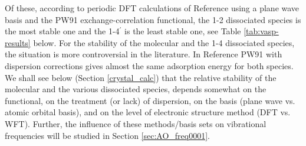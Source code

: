 \documentclass[11pt,DIV=13,BCOR=5mm,a4paper,headinclude]{scrbook}
\begin{document}
Of these, according to periodic DFT calculations of Reference\cite{WirthJPCC2012} using a plane wave basis and the PW91 exchange-correlation functional, the 1-2 dissociated species is the most stable one and the 1-4$^\prime$ is the least stable one, see Table \ref{tab:vasp-results} below.
For the stability of the molecular and the 1-4 dissociated species, the situation is more controversial in the literature\cite{WirthJPCC2012,hass00,Ranea2009}.
In Reference\cite{WirthJPCC2012} PW91 with dispersion corrections gives almost the same adsorption energy for both species.
We shall see below (Section \ref{crystal_calc}) that the relative stability of the molecular and the various dissociated species, depends somewhat on the functional, on the treatment (or lack) of dispersion, on the basis (plane wave vs. atomic orbital basis), and on the level of electronic structure method (DFT vs. WFT).
Further, the influence of these methods/basis sets on vibrational frequencies will be studied in Section \ref{sec:AO_freq0001}.
\end{document}

